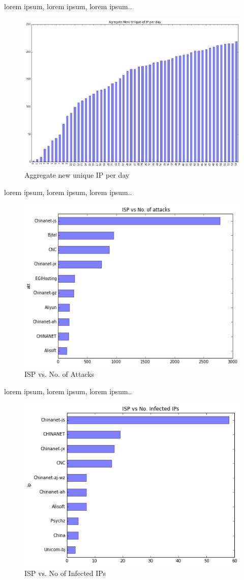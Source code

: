 \documentclass{article}
\begin{document}
lorem ipsum, lorem ipsum, lorem ipsum..


\begin{figure}[h]
\caption{Aggregate new unique IP per day}
\centering
\includegraphics[width=0.7\linewidth]{a_new_ip_da}
\end{figure}

lorem ipsum, lorem ipsum, lorem ipsum..


\begin{figure}[h]
\caption{ISP vs. No. of Attacks}
\centering
\includegraphics[width=0.7\linewidth]{isp_no_att}
\end{figure}

lorem ipsum, lorem ipsum, lorem ipsum..

\begin{figure}[h]
\caption{ISP vs. No of Infected IPs}
\centering
\includegraphics[width=0.7\linewidth]{isp_no_ip}
\end{figure}
\end{document}
